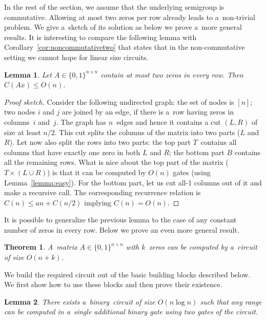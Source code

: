 \documentclass[11pt,letterpaper]{article}
\newtheorem{lemma}{Lemma}
\newtheorem{theorem}{Theorem}
\begin{document}
In the rest of the section, we assume that the underlying semigroup is commutative.
Allowing at most two zeros per row already leads to a~non-trivial 
problem. We give a~sketch of its solution as 
below we prove a~more general results.
It is interesting to compare the following lemma 
with Corollary~\ref{cor:noncommutativetwo} that states that in 
the non-commutative setting we cannot hope for linear size 
circuits. 

\begin{lemma}
Let $A \in \{0,1\}^{n \times n}$ contain at most two zeros in every row. Then $C(Ax) \le O(n)$.
\end{lemma}
\begin{proof}[Proof sketch]
Consider the following undirected graph: the set of nodes is $[n]$; two nodes $i$ and $j$ are joined by an edge, if there is a~row having zeros in columns~$i$ and~$j$. The graph has $n$~edges and hence it contains a cut $(L,R)$ of size at least $n/2$. This cut splits the columns of the matrix into two parts ($L$ and $R$). Let now also split the rows into two parts: the top part $T$~contains all columns that have exactly one zero in both $L$ and $R$; the bottom part $B$ contains all the remaining rows. What is nice about the top part of the matrix ($T \times (L \cup R)$) is that it can be computed by $O(n)$ gates (using Lemma~\ref{lemma:easy}). For the bottom part, let us cut all-1 columns out of it and make a recursive call. The corresponding recurrence relation is $C(n) \le an + C(n/2)$ implying $C(n)=O(n)$.
\end{proof}

It is possible to generalize the previous lemma to the case of
any constant number of zeros in every row. Below we prove 
an even more general result.

\begin{theorem}\label{thm:main}
A~matrix $A \in \{0,1\}^{n \times n}$ with $k$~zeros can 
be computed by a~circuit of size $O(n+k)$.
\end{theorem}

We build the required circuit out of the basic building blocks described below. We first show how to use these blocks and then prove their existence.

\begin{lemma}\label{lemma:decompose}
There exists a~binary~circuit of size $O(n\log n)$ such that
any range can be computed in a~single additional binary gate 
using two gates of the circuit.
\end{lemma}
\end{document}
